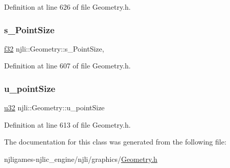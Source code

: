 Definition at line 626 of file Geometry.\+h.

\mbox{\label{classnjli_1_1_geometry_a4719e7a6be0324ad5a3369e563c8528a}} 
\subsubsection{\texorpdfstring{s\+\_\+\+Point\+Size}{s\_PointSize}}
{\footnotesize\ttfamily \mbox{\hyperlink{_util_8h_a5f6906312a689f27d70e9d086649d3fd}{f32}} njli\+::\+Geometry\+::s\+\_\+\+Point\+Size\hspace{0.3cm}{\ttfamily [static]}, {\ttfamily [private]}}



Definition at line 607 of file Geometry.\+h.

\mbox{\label{classnjli_1_1_geometry_ac5c7f121590883537de568962f8e3b96}} 
\subsubsection{\texorpdfstring{u\+\_\+point\+Size}{u\_pointSize}}
{\footnotesize\ttfamily \mbox{\hyperlink{_util_8h_a10e94b422ef0c20dcdec20d31a1f5049}{u32}} njli\+::\+Geometry\+::u\+\_\+point\+Size\hspace{0.3cm}{\ttfamily [private]}}



Definition at line 613 of file Geometry.\+h.



The documentation for this class was generated from the following file\+:\begin{DoxyCompactItemize}
\item 
njligames-\/njlic\+\_\+engine/njli/graphics/\mbox{\hyperlink{_geometry_8h}{Geometry.\+h}}\end{DoxyCompactItemize}
